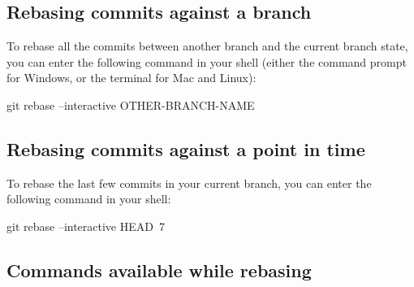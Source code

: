 \subsection{Rebasing commits against a branch}
To rebase all the commits between another branch and the current branch state, you can enter the following command in your shell (either the command prompt for Windows, or the terminal for Mac and Linux):
\begin{codeblock}[language=bash]
git rebase --interactive OTHER-BRANCH-NAME 
\end{codeblock}

\subsection{Rebasing commits against a point in time}
To rebase the last few commits in your current branch, you can enter the following command in your shell:
\begin{codeblock}[language=bash]
git rebase --interactive HEAD~7
\end{codeblock}

\subsection{Commands available while rebasing}

